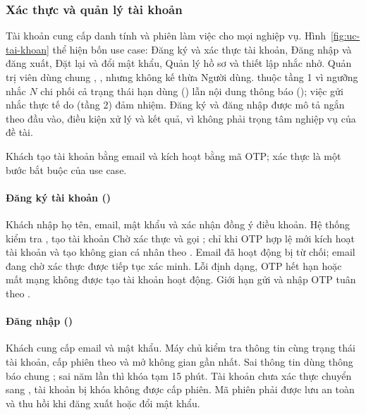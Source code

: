 \subsubsection{Xác thực và quản lý tài khoản}\label{sssec:pr-tai-khoan}

Tài khoản cung cấp danh tính và phiên làm việc cho mọi nghiệp vụ. Hình~\ref{fig:uc-tai-khoan} thể hiện bốn use case:  Đăng ký và xác thực tài khoản,  Đăng nhập và đăng xuất,  Đặt lại và đổi mật khẩu,  Quản lý hồ sơ và thiết lập nhắc nhở. Quản trị viên dùng chung , ,  nhưng không kế thừa Người dùng.  thuộc tầng 1 vì ngưỡng nhắc $N$ chi phối cả trạng thái hạn dùng () lẫn nội dung thông báo (); việc gửi nhắc thực tế do  (tầng 2) đảm nhiệm. Đăng ký và đăng nhập được mô tả ngắn theo đầu vào, điều kiện xử lý và kết quả, vì không phải trọng tâm nghiệp vụ của đề tài.



Khách tạo tài khoản bằng email và kích hoạt bằng mã OTP; xác thực là một bước bắt buộc của use case.

\paragraph*{Đăng ký tài khoản ()}
Khách nhập họ tên, email, mật khẩu và xác nhận đồng ý điều khoản. Hệ thống kiểm tra , tạo tài khoản Chờ xác thực và gọi ; chỉ khi OTP hợp lệ mới kích hoạt tài khoản và tạo không gian cá nhân theo . Email đã hoạt động bị từ chối; email đang chờ xác thực được tiếp tục xác minh. Lỗi định dạng, OTP hết hạn hoặc mất mạng không được tạo tài khoản hoạt động. Giới hạn gửi và nhập OTP tuân theo .



\paragraph*{Đăng nhập ()}
Khách cung cấp email và mật khẩu. Máy chủ kiểm tra thông tin cùng trạng thái tài khoản, cấp phiên theo  và mở không gian gần nhất. Sai thông tin dùng thông báo chung ; sai năm lần thì khóa tạm 15 phút. Tài khoản chưa xác thực chuyển sang , tài khoản bị khóa không được cấp phiên. Mã phiên phải được lưu an toàn và thu hồi khi đăng xuất hoặc đổi mật khẩu.


